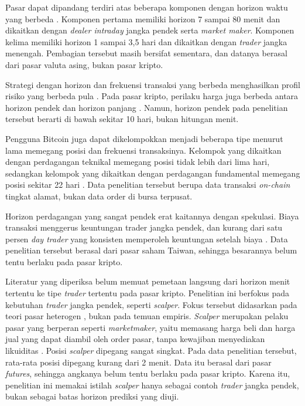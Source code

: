 Pasar dapat dipandang terdiri atas beberapa komponen dengan horizon waktu
yang berbeda \cite{muller1997}. Komponen pertama memiliki horizon 7 sampai
80 menit dan dikaitkan dengan \textit{dealer intraday} jangka pendek serta
\textit{market maker}. Komponen kelima memiliki horizon 1 sampai 3,5 hari dan
dikaitkan dengan \textit{trader} jangka menengah. Pembagian tersebut masih
bersifat sementara, dan datanya berasal dari pasar valuta asing, bukan pasar
kripto.

Strategi dengan horizon dan frekuensi transaksi yang berbeda menghasilkan
profil risiko yang berbeda pula \cite{dacorogna1995}. Pada pasar kripto,
perilaku harga juga berbeda antara horizon pendek dan horizon panjang
\cite{kakinaka2022}. Namun, horizon pendek pada penelitian tersebut berarti di
bawah sekitar 10 hari, bukan hitungan menit.

Pengguna Bitcoin juga dapat dikelompokkan menjadi beberapa tipe menurut lama
memegang posisi dan frekuensi transaksinya. Kelompok yang dikaitkan dengan
perdagangan teknikal memegang posisi tidak lebih dari lima hari, sedangkan
kelompok yang dikaitkan dengan perdagangan fundamental memegang posisi sekitar
22 hari \cite{liu2023}. Data penelitian tersebut berupa data transaksi
\textit{on-chain} tingkat alamat, bukan data order di bursa terpusat.

Horizon perdagangan yang sangat pendek erat kaitannya dengan spekulasi. Biaya
transaksi menggerus keuntungan trader jangka pendek, dan kurang dari satu
persen \textit{day trader} yang konsisten memperoleh keuntungan setelah biaya
\cite{barberdt}. Data penelitian tersebut berasal dari pasar saham Taiwan,
sehingga besarannya belum tentu berlaku pada pasar kripto.

Literatur yang diperiksa belum memuat pemetaan langsung dari horizon menit
tertentu ke tipe \textit{trader} tertentu pada pasar kripto. Penelitian ini
berfokus pada kebutuhan \textit{trader} jangka pendek, seperti
\textit{scalper}. Fokus tersebut didasarkan pada teori pasar heterogen
\cite{muller1997,dacorogna1995}, bukan pada temuan empiris.
\textit{Scalper} merupakan pelaku pasar yang berperan seperti
\textit{marketmaker}, yaitu memasang harga beli dan harga jual yang dapat
diambil oleh order pasar, tanpa kewajiban menyediakan likuiditas
\cite{silber1984}. Posisi \textit{scalper} dipegang sangat singkat. Pada data
penelitian tersebut, rata-rata posisi dipegang kurang dari 2 menit. Data itu
berasal dari pasar \textit{futures}, sehingga angkanya belum tentu berlaku
pada pasar kripto. Karena itu, penelitian ini memakai istilah
\textit{scalper} hanya sebagai contoh \textit{trader} jangka pendek, bukan
sebagai batas horizon prediksi yang diuji.

